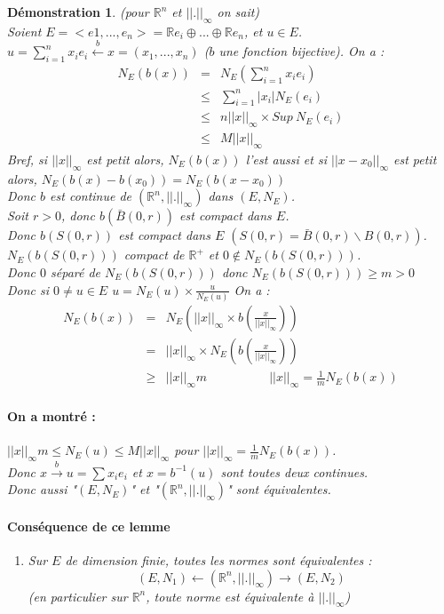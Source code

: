\documentclass[a4paper, oneside]{report}
\theoremstyle{break}
\newtheorem*{demo}{Démonstration}
\newcommand{\x}{\times}
\newcommand{\R}{\mathbb{R}}
\newcommand{\fracun}[1]{\frac{1}{#1}}
\begin{document}
\begin{demo}
(pour $\R^n$ et $||.||_ \infty$ on sait)\\
Soient $E=<e1,...,e_n>=\R e_i \oplus ... \oplus \R e_n$, et $u\in E$.\\
$u = \sum_{i=1}^nx_ie_i \overset{b}{\leftarrow} x=(x_1,...,x_n)$ ($b$ une fonction bijective).
On a :
$$
\begin{array}{lll}
N_E(b(x))&=&N_E(\sum_{i=1}^nx_ie_i)\\
&\leq & \sum_{i=1}^n|x_i|N_E(e_i)\\
&\leq & n ||x||_\infty \x Sup~N_E(e_i)\\
&\leq & M ||x||_\infty
\end{array}$$
Bref, si $||x||_\infty$ est petit alors, $N_E(b(x))$ l'est aussi et si $||x-x_0||_\infty$ est petit alors, $N_E(b(x)-b(x_0)) = N_E(b(x - x_0))$\\
Donc $b$ est continue de $(\R^n, ||.||_\infty)$ dans $(E,N_E)$.\\
Soit $r>0$, donc $b(\bar{B}(0,r))$ est compact dans $E$.\\
Donc $b(S(0,r))$ est compact dans $E$ $(S(0,r) = \bar{B}(0,r)\backslash B(0,r))$.\\
$N_E(b(S(0,r)))$ compact de $\R^+$ et $0\notin N_E(b(S(0,r)))$.\\
Donc $0$ séparé de $N_E(b(S(0,r)))$ donc $N_E(b(S(0,r))) \geq m >0$\\
Donc si $0\neq u\in E$ $u=N_E(u)\x \frac{u}{N_E(u)}$
On a :
$$\begin{array}{lll}
N_E(b(x))&=&N_E(||x||_\infty\x b(\frac{x}{||x||_\infty}))\\
&=&||x||_\infty \x N_E(b(\frac{x}{||x||_\infty}))\\
&\geq& ||x||_\infty m\hspace{5em}||x||_\infty = \fracun{m}N_E(b(x))
\end{array}$$

\paragraph{On a montré :}
$||x||_\infty m \leq N_E(u) \leq M ||x||_\infty$ pour $||x||_\infty = \fracun{m}N_E(b(x))$.\\
Donc $x\overset{b}{\rightarrow} u= \sum x_ie_i$ et $x = b^{-1}(u)$ sont toutes deux continues.\\
Donc aussi "$(E,N_E)$" et  "$(\R^n,||.||_\infty)$" sont équivalentes.\\

\paragraph{Conséquence de ce lemme}
\begin{enumerate}
\item Sur $E$ de dimension finie, toutes les normes sont équivalentes :
$$(E,N_1) \leftarrow (\R^n, ||.||_\infty) \rightarrow (E,N_2)$$
(en particulier sur $\R^n$, toute norme est équivalente à $||.||_\infty$)


\end{enumerate}
\end{demo}
\end{document}
